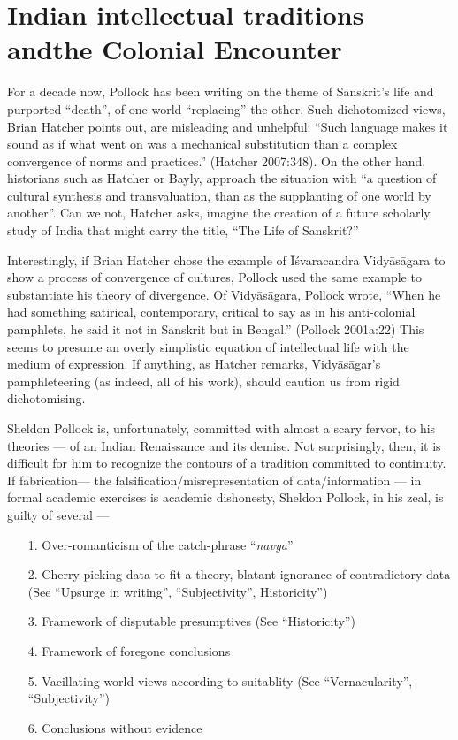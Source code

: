 \section{Indian intellectual traditions and\hfill\break the Colonial Encounter}%

For a decade now, Pollock has been writing on the theme of Sanskrit’s life and purported “death”, of one world “replacing” the other. Such dichotomized views, Brian Hatcher points out, are misleading and unhelpful: “Such language makes it sound as if what went on was a mechanical substitution than a complex convergence of norms and practices.” (Hatcher 2007:348). On the other hand, historians such as Hatcher or Bayly, approach the situation with “a question of cultural synthesis and transvaluation, than as the supplanting of one world by another”. Can we not, Hatcher asks, imagine the creation of a future scholarly study of India that might carry the title, “The Life of Sanskrit?”  

Interestingly, if  Brian Hatcher chose the example of Īśvaracandra Vidyāsāgara to show a process of convergence of cultures, Pollock used the same example to substantiate his theory of divergence. Of Vidyāsāgara, Pollock wrote, “When he had something satirical, contemporary, critical to say as in his anti-colonial pamphlets, he said it not in Sanskrit but in Bengal.” (Pollock 2001a:22) This seems to presume an overly simplistic equation of intellectual life with the medium of expression. If anything, as Hatcher remarks, Vidyāsāgar’s pamphleteering (as indeed, all of his work), should caution us from rigid dichotomising.

Sheldon Pollock is, unfortunately, committed with almost a scary fervor, to his theories — of an Indian Renaissance and its demise. Not surprisingly, then, it is difficult for him to recognize the contours of a tradition committed to continuity. If fabrication— the falsification/misrepresentation of data/information —  in formal academic exercises is academic dishonesty, Sheldon Pollock, in his zeal, is guilty of several — 
\begin{itemize}
\item[1.] Over-romanticism of the catch-phrase “{\sl navya}”
\item[2.] Cherry-picking data to fit a theory, blatant ignorance of contradictory data (See “Upsurge in writing”, “Subjectivity”, Historicity”)
\item[3.] Framework of disputable presumptives (See “Historicity”)
\item[4.] Framework of foregone conclusions 
\item[5.] Vacillating world-views according to suitablity (See “Vernacularity”, “Subjectivity”)
\item[6.] Conclusions without evidence
\end{itemize}

